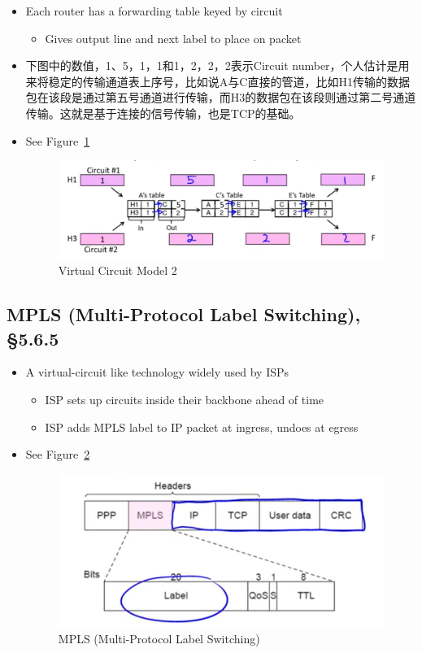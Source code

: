 \documentclass[12pt]{ctexart}   %
\begin{document}
\begin{itemize}
		 \item Each router has a forwarding table keyed by circuit
		 \begin{itemize}
		 	\item Gives output line and next label to place on packet
		 \end{itemize}
		 \item 下图中的数值，1、5，1，1和1，2，2，2表示Circuit number，个人估计是用来将稳定的传输通道表上序号，比如说A与C直接的管道，比如H1传输的数据包在该段是通过第五号通道进行传输，而H3的数据包在该段则通过第二号通道传输。这就是基于连接的信号传输，也是TCP的基础。
		 \item See Figure~\ref{fig:4-2-7}
		
		\begin{figure}[h!] %
		\centering
		 \includegraphics[scale=0.7]{images/4-2-7}
		\caption{ Virtual Circuit Model 2 }
		 \label{fig:4-2-7}
		 \end{figure}
	\end{itemize}
	
	\subsection{MPLS (Multi-Protocol Label Switching), §5.6.5}
	\begin{itemize}
		\item A virtual-circuit like technology widely used by ISPs
		\begin{itemize}
			\item ISP sets up circuits inside their backbone ahead of time
			\item ISP adds MPLS label to IP packet at ingress, undoes at egress
		\end{itemize}
		\item See Figure~\ref{fig:4-2-8}
		
		\begin{figure}[h!] %
		\centering
		 \includegraphics[scale=0.7]{images/4-2-8}
		\caption{ MPLS (Multi-Protocol Label Switching) }
		 \label{fig:4-2-8}
		 \end{figure}
		
	\end{itemize}
	
\end{document}
